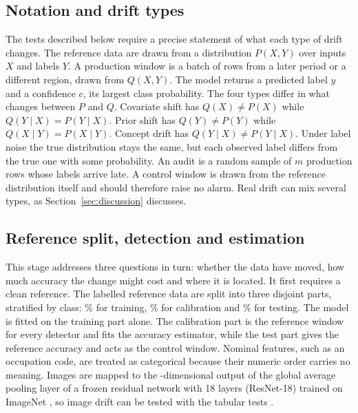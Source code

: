 \documentclass[10pt]{article}
\begin{document}
\subsection{Notation and drift types}
\label{sec:types}
The tests described below require a precise statement of what each type of drift changes. The reference data are drawn from a distribution $P(X,Y)$ over inputs $X$ and labels $Y$. A production window is a batch of rows from a later period or a different region, drawn from $Q(X,Y)$. The model returns a predicted label $\hat y$ and a confidence $c$, its largest class probability. The four types differ in what changes between $P$ and $Q$. Covariate shift has $Q(X)\neq P(X)$ while $Q(Y\mid X)=P(Y\mid X)$. Prior shift has $Q(Y)\neq P(Y)$ while $Q(X\mid Y)=P(X\mid Y)$. Concept drift has $Q(Y\mid X)\neq P(Y\mid X)$. Under label noise the true distribution stays the same, but each observed label differs from the true one with some probability. An audit is a random sample of $m$ production rows whose labels arrive late. A control window is drawn from the reference distribution itself and should therefore raise no alarm. Real drift can mix several types, as Section~\ref{sec:discussion} discusses.

\subsection{Reference split, detection and estimation}
This stage addresses three questions in turn: whether the data have moved, how much accuracy the change might cost and where it is located. It first requires a clean reference. The labelled reference data are split into three disjoint parts, stratified by class: \% for training, \% for calibration and \% for testing. The model is fitted on the training part alone. The calibration part is the reference window for every detector and fits the accuracy estimator, while the test part gives the reference accuracy and acts as the control window. Nominal features, such as an occupation code, are treated as categorical because their numeric order carries no meaning. Images are mapped to the -dimensional output of the global average pooling layer of a frozen residual network with 18 layers (ResNet-18) trained on ImageNet \cite{he2016deep}, so image drift can be tested with the tabular tests \cite{rabanser2019failing}.
\end{document}
